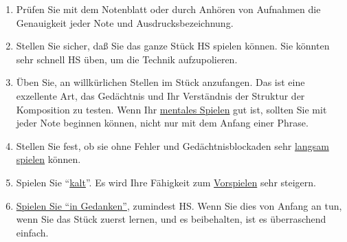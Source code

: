 \begin{enumerate}[label={\arabic*.}] 
\item Prüfen Sie mit dem Notenblatt oder durch Anhören von Aufnahmen die Genauigkeit jeder Note und Ausdrucksbezeichnung.
\item Stellen Sie sicher, daß Sie das ganze Stück HS spielen können.
Sie könnten sehr schnell HS üben, um die Technik aufzupolieren.
\item Üben Sie, an willkürlichen Stellen im Stück anzufangen.
Das ist eine exzellente Art, das Gedächtnis und Ihr Verständnis der Struktur der Komposition zu testen.
Wenn Ihr \hyperref[c1iii6tastatur]{mentales Spielen} gut ist, sollten Sie mit jeder Note beginnen können, nicht nur mit dem Anfang einer Phrase.
\item Stellen Sie fest, ob sie ohne Fehler und Gedächtnisblockaden sehr \hyperref[c1iii6h]{langsam spielen} können.
\item Spielen Sie \enquote{\hyperref[c1iii6g]{kalt}}. Es wird Ihre Fähigkeit zum \hyperref[c1iii14]{Vorspielen} sehr steigern.
\item \hyperref[c1iii6tastatur]{Spielen Sie \enquote{in Gedanken}}, zumindest HS.
Wenn Sie dies von Anfang an tun, wenn Sie das Stück zuerst lernen, und es beibehalten, ist es überraschend einfach.
 \end{enumerate} 


